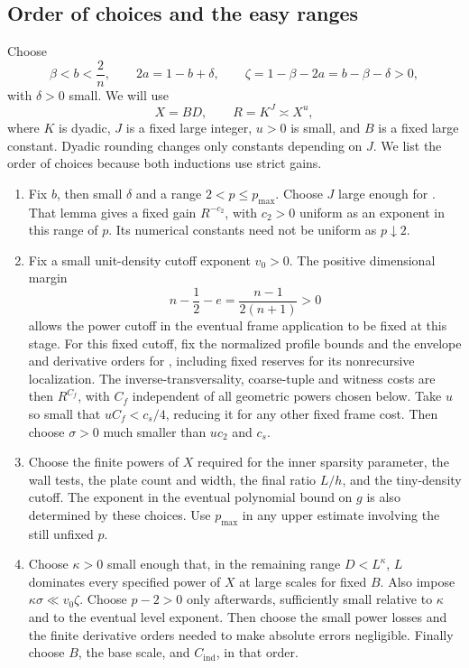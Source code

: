 \subsection{Order of choices and the easy ranges}\label{w:choices}

Choose
\begin{equation}\label{w:eq-ab}
 \beta<b<\frac2n,\qquad 2a=1-b+\delta,
 \qquad \zeta=1-\beta-2a=b-\beta-\delta>0,
\end{equation}
with $\delta>0$ small.  We will use
\[
 X=BD,\qquad R=K^J\asymp X^u,
\]
where $K$ is dyadic, $J$ is a fixed large integer, $u>0$ is small, and
$B$ is a fixed large constant.  Dyadic rounding changes only constants
depending on $J$.  We list the order of choices because both inductions
use strict gains.

\begin{enumerate}[label=\textup{(\roman*)}]
\item Fix $b$, then small $\delta$ and a range $2<p\leq p_{\max}$.
Choose $J$ large enough for .  That lemma gives a fixed
gain $R^{-c_2}$, with $c_2>0$ uniform as an exponent in this range of
$p$.  Its numerical constants need not be uniform as $p\downarrow2$.
\item Fix a small unit-density cutoff exponent $v_0>0$.  The positive
dimensional margin
\begin{equation}\label{w:eq-threshold-margin}
 n-\frac12-e=\frac{n-1}{2(n+1)}>0
\end{equation}
allows the power cutoff in the eventual frame application to be fixed
at this stage.  For this fixed cutoff, fix the normalized profile
bounds and the envelope and derivative orders for ,
including fixed reserves for its nonrecursive localization.  The
inverse-transversality, coarse-tuple and witness costs are then
$R^{C_f}$, with $C_f$ independent of all geometric
powers chosen below.  Take $u$ so small that $uC_f<c_s/4$, reducing it
for any other fixed frame cost.  Then choose $\sigma>0$ much smaller
than $uc_2$ and $c_s$.
\item Choose the finite powers of $X$ required for the inner sparsity
parameter, the wall tests, the plate count and width, the final ratio
$L/h$, and the tiny-density cutoff.  The exponent in the eventual
polynomial bound on $g$ is also determined by these choices.  Use
$p_{\max}$ in any upper estimate involving the still unfixed $p$.
\item Choose $\kappa>0$ small enough that, in the remaining range
$D<L^\kappa$, $L$ dominates every specified power of $X$ at large
scales for fixed $B$.  Also impose
$\kappa\sigma\ll v_0\zeta$.  Choose $p-2>0$ only afterwards,
sufficiently small relative to $\kappa$ and to the eventual level
exponent.  Then choose the small power losses and the finite derivative
orders needed to make absolute errors negligible.  Finally choose $B$,
the base scale, and $C_{\mathrm{ind}}$, in that order.
\end{enumerate}

